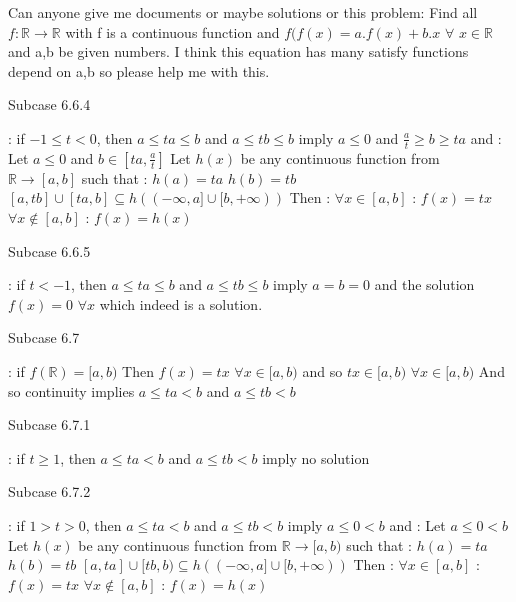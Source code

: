 \begin{solution}
	\begin{tcolorbox}Can anyone give me documents or maybe solutions or this problem: 
Find all $f:\mathbb{R}\rightarrow\mathbb{R}$ with f is a continuous function and $ f(f(x) = a. f(x) + b.x$ $\forall$ $x\in\mathbb{R}$ and a,b be given numbers.
I think this equation has many satisfy functions depend on a,b so please help me with this.\end{tcolorbox}


\begin{bolded}Subcase 6.6.4\end{bolded} : if $-1\le t<0$, then $a\le ta\le b$ and $a\le tb\le b$ imply $a\le 0$ and $\frac at\ge b\ge ta$ and :
Let $a\le 0$ and $b\in[ta,\frac at]$
Let $h(x)$ be any continuous function from $\mathbb R\to[a,b]$ such that :
$h(a)=ta$
$h(b)=tb$
$[a,tb]\cup[ta,b]\subseteq h((-\infty,a]\cup[b,+\infty))$
Then :
$\forall x\in[a,b]$ : $f(x)=tx$
$\forall x\notin[a,b]$ : $f(x)=h(x)$

\begin{bolded}Subcase 6.6.5 \end{bolded}: if $t<-1$, then $a\le ta\le b$ and $a\le tb\le b$ imply $a=b=0$ and the solution $f(x)=0$ $\forall x$ which indeed is a solution.

\begin{bolded}Subcase 6.7\end{bolded} : if $f(\mathbb R)=[a,b)$
Then $f(x)=tx$ $\forall x\in [a,b)$ and so $tx\in[a,b)$ $\forall x\in[a,b)$
And so continuity implies $a\le ta< b$ and $a\le tb< b$

\begin{bolded}Subcase 6.7.1\end{bolded} : if $t\ge 1$, then $a\le ta< b$ and $a\le tb< b$ imply no solution

\begin{bolded}Subcase 6.7.2\end{bolded} : if $1>t>0$, then $a\le ta< b$ and $a\le tb< b$ imply $a\le 0< b$ and :
Let $a\le 0< b$
Let $h(x)$ be any continuous function from $\mathbb R\to[a,b)$ such that :
$h(a)=ta$
$h(b)=tb$
$[a,ta]\cup[tb,b)\subseteq h((-\infty,a]\cup[b,+\infty))$
Then :
$\forall x\in[a,b]$ : $f(x)=tx$
$\forall x\notin[a,b]$ : $f(x)=h(x)$


\end{solution}
